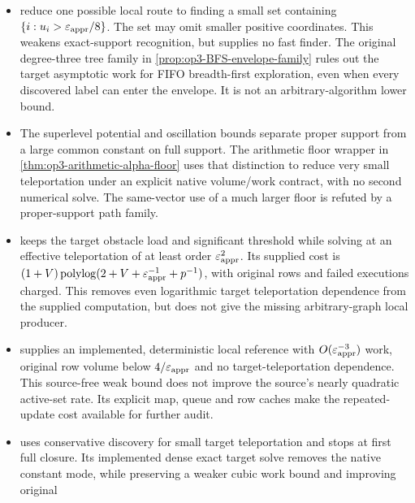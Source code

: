 \documentclass[11pt]{article}
\begin{document}
\begin{itemize}
\cref{cor:op3-weighted-constructor-contract,thm:op3-complete-supplied-recursion}.
The numerical, routing, resistance and sampling interfaces have exact
audits; the low-stretch tree remains an explicit source algorithm, and the
entire asymptotic recursion is not claimed as an implemented experiment.
All work here remains on a supplied graph.
\item {}
reduce one possible local route to finding a small set containing
$\{i:u_i>\varepsilon_{\mathrm{appr}}/8\}$. The set may omit smaller positive coordinates.
This weakens exact-support recognition, but supplies no fast finder.
The original degree-three tree family in
\cref{prop:op3-BFS-envelope-family} rules out the target asymptotic work
for FIFO breadth-first exploration, even when every discovered label can
enter the envelope. It is not an arbitrary-algorithm lower bound.
\item The superlevel potential and oscillation bounds separate proper
support from a large common constant on full support. The arithmetic
floor wrapper in \cref{thm:op3-arithmetic-alpha-floor} uses that distinction
to reduce very small teleportation under an explicit native volume/work
contract, with no second numerical solve. The same-vector use of a much
larger floor is refuted by a proper-support path family.
\item {} keeps the target
obstacle load and significant threshold while solving at an effective
teleportation of at least order $\varepsilon_{\mathrm{appr}}^2$. Its supplied cost is
$(1+V)\operatorname{polylog}(2+V+\varepsilon_{\mathrm{appr}}^{-1}+p^{-1})$, with original
rows and failed executions charged. This removes even logarithmic target
teleportation dependence from the supplied computation, but does not give
the missing arbitrary-graph local producer.
\item {} supplies an implemented,
deterministic local reference with $O(\varepsilon_{\mathrm{appr}}^{-3})$ work, original
row volume below $4/\varepsilon_{\mathrm{appr}}$ and no target-teleportation dependence.
This source-free weak bound does not improve the source's nearly
quadratic active-set rate. Its explicit map, queue and row caches make
the repeated-update cost available for further audit.
\item {} uses conservative
discovery for small target teleportation and stops at first full closure.
Its implemented dense exact target solve removes the native constant
mode, while preserving a weaker cubic work bound and improving original

\end{itemize}
\end{document}
